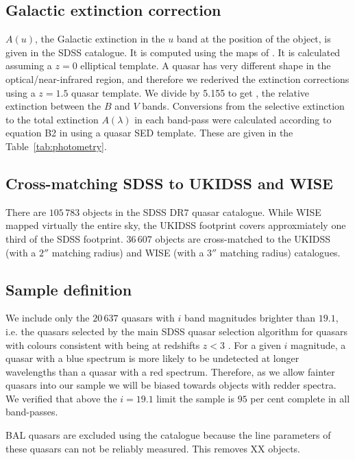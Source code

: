 \subsection{Galactic extinction correction}

$A(u)$, the Galactic extinction in the $u$ band at the position of the object, is given in the SDSS catalogue. 
It is computed using the maps of \citet{schlegel98}.
It is calculated assuming a $z=0$ elliptical template. 
A quasar has very different shape in the optical/near-infrared region, and therefore we rederived the extinction corrections using a $z=1.5$ quasar template. 
We divide by 5.155 to get \ebv, the relative extinction between the $B$ and $V$ bands. 
Conversions from the selective extinction \ebv\, to the total extinction $A(\lambda)$ in each band-pass were calculated according to equation B2 in \citet{schlegel98} using a quasar SED template. 
These are given in the Table~\ref{tab:photometry}. 

\subsection{Cross-matching SDSS to UKIDSS and WISE}

There are $105\,783$ objects in the SDSS DR$7$ quasar catalogue. 
While WISE mapped virtually the entire sky, the UKIDSS footprint covers approxmiately one third of the SDSS footprint. 
$36\,607$ objects are cross-matched to the UKIDSS (with a $2''$ matching radius) and WISE (with a $3$$''$ matching radius) catalogues.

\subsection{Sample definition}

We include only the $20\,637$ quasars with $i$ band magnitudes brighter than $19.1$, i.e. the quasars selected by the main SDSS quasar selection algorithm for quasars with colours consistent with being at redshifts $z < 3$ \citep{richards02}. 
For a given $i$ magnitude, a quasar with a blue spectrum is more likely to be undetected at longer wavelengths than a quasar with a red spectrum. 
Therefore, as we allow fainter quasars into our sample we will be biased towards objects with redder spectra.
We verified that above the $i=19.1$ limit the sample is $95$ per cent complete in all band-passes.

BAL quasars are excluded using the \citet{allen11} catalogue because the  line parameters of these quasars can not be reliably measured.
This removes XX objects. 

